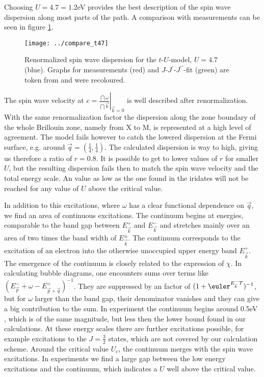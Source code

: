 \documentclass[a4paper,12pt]{report}
\begin{document}
Choosing $U=4.7 = 1.2$eV provides the best description of the spin wave dispersion along most parts of the path.
A comparison with measurements can be seen in figure \ref{tU47}. 
%
\begin{figure}
 \begin{center}
  \texttt{[image: ../compare\_t47]}
  \caption{Renormalized spin wave dispersion for the $t$-$U$-model, $U=4.7$ (blue). Graphs for measurements (red) and $J$-$J^{\prime}$-$J^{\prime \prime}$-fit (green) are
	    token from \cite{PhysRevLett.106.136402} and were recoloured.}
 \label{tU47}
 \end{center}
\end{figure}
%
The spin wave velocity at $c=\left. \frac{\dint \omega}{\dint \vec k} \right|_{\vec k = 0}$ is well described after renormalization.
With the same renormalization factor the dispersion along
the zone boundary of the whole Brillouin zone, namely from X to M, is represented at a high level of agreement.
The model fails however to catch the lowered dispersion at the Fermi surface, e.g. around $\vec q = (\frac 14, \frac14)$.
The calculated dispersion is way to high, giving us therefore a ratio of $r=0.8$. 
It is possible to get to lower values of $r$ for smaller $U$, but the resulting dispersion fails then to match the spin wave velocity and 
the total energy scale. An value as low as the one found in the iridates will not be reached for any value of $U$ above the critical value.


In addition to this excitations, where $\omega$ has a clear functional dependence on $\vec q$, 
we find an area of continuous excitations.
The continuum begins at energies, comparable to the band gap between $E^+_{\vec k}$ and $E^-_{\vec k}$ and 
stretches mainly over an area of two times the band width of $E^{\pm}_{\vec k}$.
The continuum corresponds to the excitation of an electron into the otherwise unoccupied upper energy band $E^+_{\vec k}$.
The emergence of the continuum is closely related to the expression of $\chi$. 
In calculating bubble diagrams, one encounters sums over terms like $(E^{-}_{\vec p} +\omega - E^+_{\vec p + \vec q})^{-1}$.
They are suppressed by an factor of $(1+\euler^{E^-_{\vec k} T})^{-1}$, but
for $\omega$ larger than the band gap, their denominator vanishes and they can give a big contribution to the sum. 
In experiment the continuum begins around 0.5eV \cite{PhysRevLett.86.5377}, which is of the same magnitude, but less then the lower bound found in our calculations.
At these energy scales there are further excitations possible, for example excitations to the $J=\frac32$ states, which are not covered by our calculation scheme.
Around the critical value $U_c$, the continuum merges with the spin wave excitations. 
In experiments we find a large gap between the low energy excitations and the continuum, which indicates a $U$ well above the critical value. 
\end{document}
